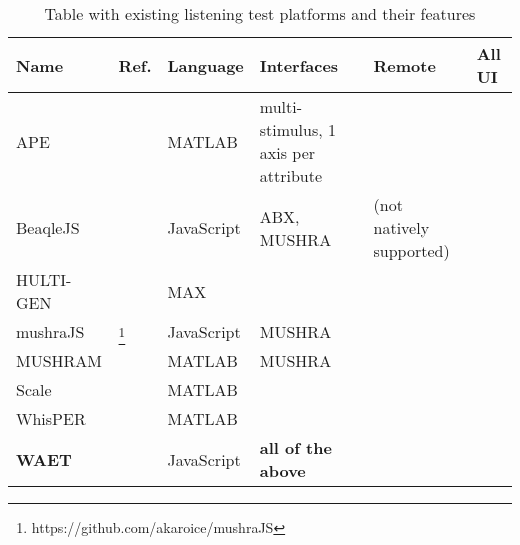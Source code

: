 \documentclass{sig-alternate}
\begin{document}
	\begin{table*}[ht]
    \caption{Table with existing listening test platforms and their features}
    \begin{center}
    	\begin{tabular}{|*{6}{l|}}
    		\hline
    		\textbf{Name} 	& \textbf{Ref.} 	& \textbf{Language} 	& \textbf{Interfaces} 			& \textbf{Remote} 			& \textbf{All UI} 	\\
    		\hline
    		APE 			& \cite{ape}		& MATLAB				& multi-stimulus, 1 axis per attribute 	& 					& 			 \\
    		BeaqleJS		& \cite{beaqlejs}	& JavaScript			& ABX, MUSHRA 					& (not natively supported) 	& 			 \\
    		HULTI-GEN 		& \cite{hultigen}	& MAX 					& 								& 							& \checkmark \\
    		mushraJS		& \footnote{https://github.com/akaroice/mushraJS} & JavaScript & MUSHRA 			& \checkmark				& 	 \\
    		MUSHRAM			& \cite{mushram}	& MATLAB				& MUSHRA						& 							& 			 \\
    		Scale 			& \cite{scale}		& MATLAB				& 								&							&			 \\
    		WhisPER			& \cite{whisper}	& MATLAB				&								&							& \checkmark \\
    		\textbf{WAET}	& \cite{waet}		& JavaScript			& \textbf{all of the above}		& \checkmark				& \checkmark \\
    		\hline
    	\end{tabular}
    \end{center}
    \label{tab:toolboxes}
    \end{table*}%
\end{document}
